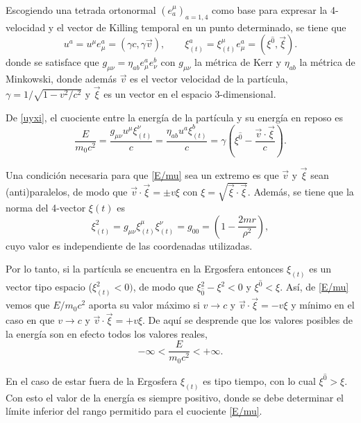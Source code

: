 Escogiendo una tetrada ortonormal $\left(e^{\mu}_a\right)_{a=1,4}$ como base  para expresar la 4-velocidad y el vector de Killing temporal en un punto determinado, se tiene que
\begin{equation}\label{uyxi}
u^a=u^{\mu}e^a_{\mu}=(\gamma c, \gamma \vec{v}), \qquad \xi^a_{(t)}=\xi^{\mu}_{(t)}e^a_{\mu}=\left(\xi^{\hat{0}},\vec{\xi} \right).
\end{equation}
donde se satisface que $g_{\mu \nu}=\eta_{ab}e^a_{\mu}e^b_{\nu}$ con $g_{\mu \nu}$ la métrica de Kerr y $\eta_{ab}$ la métrica de Minkowski, donde además $\vec{v}$ es el vector velocidad de la partícula, $\gamma=1/\sqrt{1-{v^2}/{c^2}}$ y $\vec{\xi}$ es un vector en el espacio 3-dimensional.

De \eqref{uyxi}, el cuociente entre la energía de la partícula y su energía en reposo es
\begin{equation}\label{E/mu}
\frac{E}{m_0c^2}=\frac{g_{\mu \nu}u^{\mu}\xi_{(t)}^{\nu}}{c}=\frac{\eta_{ab}u^a\xi^b_{(t)}}{c}=\gamma\left(\xi^{\hat{0}}-\frac{\vec{v} \cdot \vec{\xi}}{c} \right).
\end{equation}

Una condición necesaria para que \eqref{E/mu} sea un extremo es que $\vec{v}$ y $\vec{\xi}$ sean (anti)paralelos, de modo que $\vec{v} \cdot \vec{\xi}=\pm v\xi$ con $\xi=\sqrt{\vec{\xi}\cdot \vec{\xi}}$. Además, se tiene que la norma del 4-vector $\xi{(t)}$ es 
\begin{equation}\label{xi2}
\xi_{(t)}^2=g_{\mu \nu} \xi_{(t)}^{\mu}\xi_{(t)}^{\nu}=g_{00}=\left( 1-\frac{2mr}{\rho^2}\right),
\end{equation}
cuyo valor es independiente de las coordenadas utilizadas.

Por lo tanto, si la partícula se encuentra en la Ergosfera entonces $\xi_{(t)}$ es un vector tipo espacio ($\xi^2_{(t)}<0)$, de modo que $\xi_{\hat{0}}^2-\xi^{2}<0$ y $\xi^{\hat{0}} < \xi$. Así, de \eqref{E/mu} vemos que $E/m_0c^2$ aporta su valor máximo si  $v \rightarrow c$ y $\vec{v} \cdot \vec{\xi}=-v\xi$ y mínimo en el caso en que $v \rightarrow c$ y $\vec{v} \cdot \vec{\xi}=+v\xi$. De aquí se desprende que los valores posibles de la energía son en efecto todos los valores reales,
\begin{equation}\label{condicion1}
-\infty <\frac{E}{m_0c^2}<+\infty.
\end{equation}

En el caso de estar fuera de la Ergosfera $\xi_{(t)}$ es tipo tiempo, con lo cual $\xi^{\hat{0}} >\xi$. Con esto el valor de la energía es siempre positivo, donde se debe determinar el límite inferior del rango permitido para el cuociente \eqref{E/mu}.

